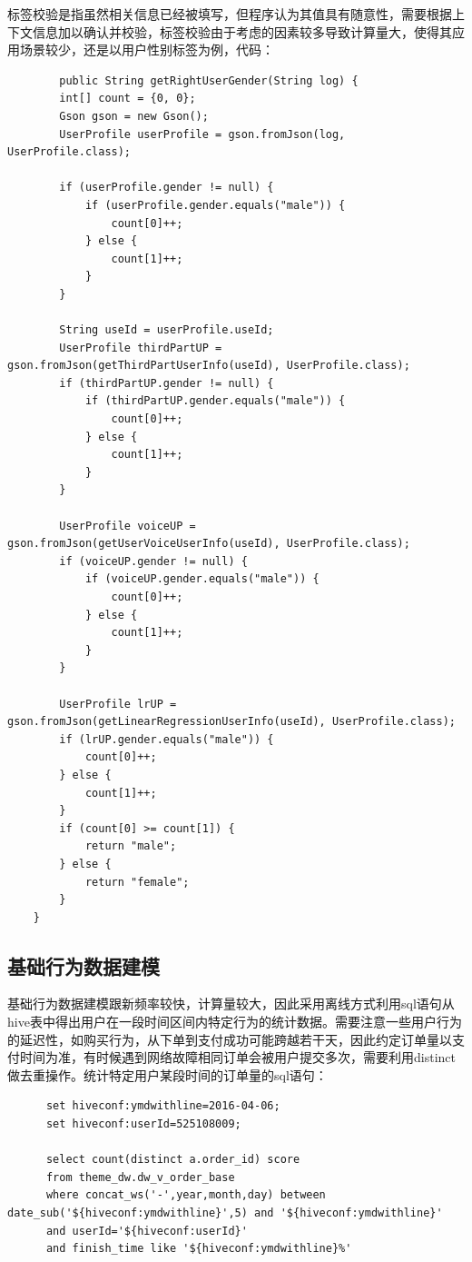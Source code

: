     标签校验是指虽然相关信息已经被填写，但程序认为其值具有随意性，需要根据上下文信息加以确认并校验，标签校验由于考虑的因素较多导致计算量大，使得其应用场景较少，还是以用户性别标签为例，代码：
    \begin{lstlisting}
        public String getRightUserGender(String log) {
        int[] count = {0, 0};
        Gson gson = new Gson();
        UserProfile userProfile = gson.fromJson(log, UserProfile.class);

        if (userProfile.gender != null) {
            if (userProfile.gender.equals("male")) {
                count[0]++;
            } else {
                count[1]++;
            }
        }

        String useId = userProfile.useId;
        UserProfile thirdPartUP = gson.fromJson(getThirdPartUserInfo(useId), UserProfile.class);
        if (thirdPartUP.gender != null) {
            if (thirdPartUP.gender.equals("male")) {
                count[0]++;
            } else {
                count[1]++;
            }
        }

        UserProfile voiceUP = gson.fromJson(getUserVoiceUserInfo(useId), UserProfile.class);
        if (voiceUP.gender != null) {
            if (voiceUP.gender.equals("male")) {
                count[0]++;
            } else {
                count[1]++;
            }
        }

        UserProfile lrUP = gson.fromJson(getLinearRegressionUserInfo(useId), UserProfile.class);
        if (lrUP.gender.equals("male")) {
            count[0]++;
        } else {
            count[1]++;
        }
        if (count[0] >= count[1]) {
            return "male";
        } else {
            return "female";
        }
    }
    \end{lstlisting}

    \subsection{基础行为数据建模}
    基础行为数据建模跟新频率较快，计算量较大，因此采用离线方式利用sql语句从hive表中得出用户在一段时间区间内特定行为的统计数据。需要注意一些用户行为的延迟性，如购买行为，从下单到支付成功可能跨越若干天，因此约定订单量以支付时间为准，有时候遇到网络故障相同订单会被用户提交多次，需要利用distinct做去重操作。统计特定用户某段时间的订单量的sql语句：
    \begin{lstlisting}
      set hiveconf:ymdwithline=2016-04-06;
      set hiveconf:userId=525108009;

      select count(distinct a.order_id) score
      from theme_dw.dw_v_order_base
      where concat_ws('-',year,month,day) between date_sub('${hiveconf:ymdwithline}',5) and '${hiveconf:ymdwithline}'
      and userId='${hiveconf:userId}'
      and finish_time like '${hiveconf:ymdwithline}%'
    \end{lstlisting}

